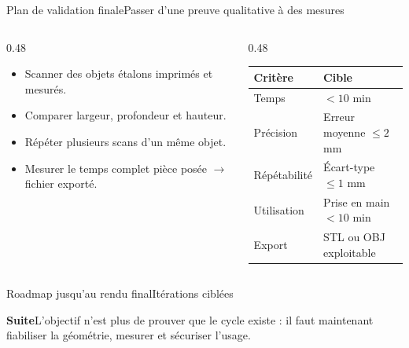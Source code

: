 \documentclass[aspectratio=169,10pt]{beamer}
\newcommand{\nextbox}[1]{%
  \begin{beamercolorbox}[wd=\linewidth,sep=0.25cm,rounded=true]{}
    \colorbox{softblue}{%
      \parbox{\dimexpr\linewidth-0.5cm\relax}{\textbf{\textcolor{deepblue}{Suite}}\quad #1}%
    }
  \end{beamercolorbox}
}
\begin{document}
\begin{frame}{Plan de validation finale}{Passer d'une preuve qualitative à des mesures}
  \begin{columns}[T,onlytextwidth]
    \begin{column}{0.48\textwidth}
      \begin{itemize}
        \item Scanner des objets étalons imprimés et mesurés.
        \item Comparer largeur, profondeur et hauteur.
        \item Répéter plusieurs scans d'un même objet.
        \item Mesurer le temps complet pièce posée $\rightarrow$ fichier exporté.
      \end{itemize}
    \end{column}
    \begin{column}{0.48\textwidth}
      \begin{tabularx}{\linewidth}{@{}p{3.2cm}X@{}}
        \toprule
        \textbf{Critère} & \textbf{Cible} \\
        \midrule
        Temps & $<10$ min \\
        Précision & Erreur moyenne $\leq 2$ mm \\
        Répétabilité & Écart-type $\leq 1$ mm \\
        Utilisation & Prise en main $<10$ min \\
        Export & STL ou OBJ exploitable \\
        \bottomrule
      \end{tabularx}
    \end{column}
  \end{columns}
\end{frame}

\begin{frame}{Roadmap jusqu'au rendu final}{Itérations ciblées}

  \vspace{1.9cm}
  \nextbox{L'objectif n'est plus de prouver que le cycle existe : il faut maintenant fiabiliser la géométrie, mesurer et sécuriser l'usage.}
\end{frame}
\end{document}
